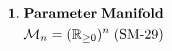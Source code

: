 \documentclass[preview]{standalone}
\begin{document}
\begin{align*}
\special{dvisvgm:raw <g id='unique000'>}\mathbf{1.\;Parameter\;Manifold}\\\mathcal{M}_n=(\mathbb{R}_{\ge 0})^n\;(\text{SM-29})\special{dvisvgm:raw </g>}
\end{align*}
\end{document}
